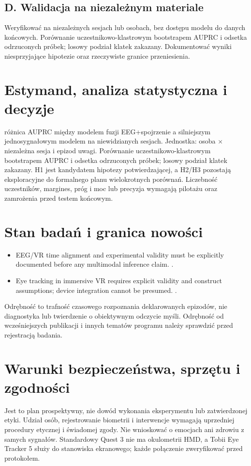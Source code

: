 \documentclass[11pt,a4paper]{article}
\begin{document}
\subsection{D. Walidacja na niezależnym materiale}
Weryfikować na niezależnych sesjach lub osobach, bez dostępu modelu do danych końcowych. Porównanie uczestnikowo-klastrowym bootstrapem AUPRC i odsetka odrzuconych próbek; losowy podział klatek zakazany. Dokumentować wyniki niesprzyjające hipotezie oraz rzeczywiste granice przeniesienia.
\section{Estymand, analiza statystyczna i decyzje}
różnica AUPRC między modelem fuzji EEG+spojrzenie a silniejszym jednosygnałowym modelem na niewidzianych sesjach. Jednostka: osoba × niezależna sesja i epizod uwagi. Porównanie uczestnikowo-klastrowym bootstrapem AUPRC i odsetka odrzuconych próbek; losowy podział klatek zakazany. H1 jest kandydatem hipotezy potwierdzającej, a H2/H3 pozostają eksploracyjne do formalnego planu wielokrotnych porównań. Liczebność uczestników, margines, próg i moc lub precyzja wymagają pilotażu oraz zamrożenia przed testem końcowym.
\section{Stan badań i granica nowości}
\begin{itemize}
\item EEG/VR time alignment and experimental validity must be explicitly documented before any multimodal inference claim. \cite{xrprior1}.
\item Eye tracking in immersive VR requires explicit validity and construct assumptions; device integration cannot be presumed. \cite{xrprior2}.
\end{itemize}
Odrębność to trafność czasowego rozpoznania deklarowanych epizodów, nie diagnostyka lub twierdzenie o obiektywnym odczycie myśli. Odrębność od wcześniejszych publikacji i innych tematów programu należy sprawdzić przed rejestracją badania.
\section{Warunki bezpieczeństwa, sprzętu i zgodności}
Jest to plan prospektywny, nie dowód wykonania eksperymentu lub zatwierdzonej etyki. Udział osób, rejestrowanie biometrii i interwencje wymagają uprzedniej procedury etycznej i świadomej zgody. Nie wnioskować o emocjach ani zdrowiu z samych sygnałów. Standardowy Quest 3 nie ma okulometrii HMD, a Tobii Eye Tracker 5 służy do stanowiska ekranowego; każde połączenie zweryfikować przed protokołem.
\end{document}
